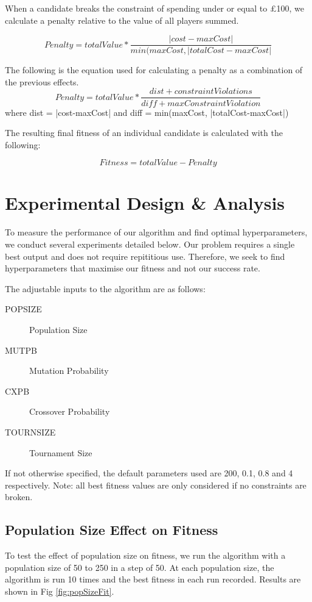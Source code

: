 \documentclass[11pt,a4paper]{article}
\begin{document}
When a candidate breaks the constraint of spending under or equal to £100, we calculate a penalty relative to the value of all players summed.

\begin{equation}
Penalty = totalValue * \frac{|cost-maxCost|}{min(maxCost, |totalCost-maxCost|}
\end{equation}



The following is the equation used for calculating a penalty as a combination of the previous effects.
\begin{equation}
Penalty = totalValue * \frac{dist+constraintViolations}{diff+maxConstraintViolation}
\end{equation}
%
where dist = |cost-maxCost| and diff = min(maxCost, |totalCost-maxCost|)

The resulting final fitness of an individual candidate is calculated with the following:

\begin{equation}
Fitness= totalValue-Penalty
\end{equation}

\section{Experimental Design \& Analysis}
To measure the performance of our algorithm and find optimal hyperparameters, we conduct several experiments detailed below. Our problem requires a single best output and does not require repititious use. Therefore, we seek to find hyperparameters that maximise our fitness and not our success rate.

The adjustable inputs to the algorithm are as follows:
\begin{description}
\item[POPSIZE] Population Size
\item[MUTPB] Mutation Probability
\item[CXPB] Crossover Probability
\item[TOURNSIZE] Tournament Size
\end{description}

If not otherwise specified, the default parameters used are 200, 0.1, 0.8 and 4 respectively.
Note: all best fitness values are only considered if no constraints are broken.

\subsection{Population Size Effect on Fitness}
To test the effect of population size on fitness, we run the algorithm with a population size of 50 to 250 in a step of 50. At each population size, the algorithm is run 10 times and the best fitness in each run recorded. Results are shown in Fig  \ref{fig:popSizeFit}.
\end{document}
